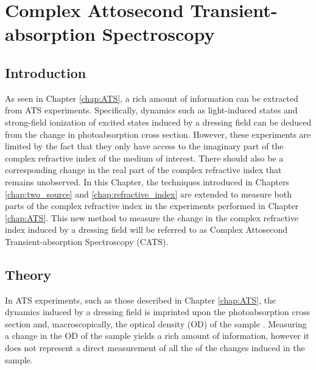 \chapter{Complex Attosecond Transient-absorption Spectroscopy}
\label{chap:CATS}

\section{Introduction}
\label{sec:intro_cats}

As seen in Chapter \ref{chap:ATS}, a rich amount of information can be extracted from ATS experiments.  Specifically, dynamics such as light-induced states and strong-field ionization of  excited states induced by a dressing field can be deduced from the change in photoabsorption cross section.  However, these experiments are limited by the fact that they only have access to the imaginary part of the complex refractive index of the medium of interest. There should also be a corresponding change in the real part of the complex refractive index that remains unobserved.  In this Chapter, the techniques introduced in Chapters \ref{chap:two_source} and \ref{chap:refractive_index} are extended to measure both parts of the complex refractive index in the experiments performed in Chapter \ref{chap:ATS}.  This new method to measure the change in the complex refractive index induced by a dressing field will be referred to as Complex Attosecond Transient-absorption Spectroscopy (CATS).


\section{Theory}
\label{sec:cats_theory}

In ATS experiments, such as those described in Chapter \ref{chap:ATS}, the dynamics induced by a dressing field is imprinted upon the photoabsorption cross section and, macroscopically, the optical density (OD) of the sample \cite{wuTheoryStrongfieldAttosecond2016,geneauxromainTransientAbsorptionSpectroscopy2019}.  Measuring a change in the OD of the sample yields a rich amount of information, however it does not represent a direct measurement of all the of the changes induced in the sample. 

